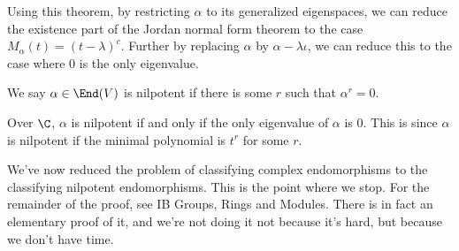 \documentclass[a4paper]{article}
\begin{document}
Using this theorem, by restricting $\alpha$ to its generalized eigenspaces, we can reduce the existence part of the Jordan normal form theorem to the case $M_\alpha(t) = (t - \lambda)^c$. Further by replacing $\alpha$ by $\alpha - \lambda \iota$, we can reduce this to the case where $0$ is the only eigenvalue.

\begin{defi}[Nilpotent]
  We say $\alpha \in \End(V)$ is nilpotent if there is some $r$ such that $\alpha^r = 0$.
\end{defi}
Over $\C$, $\alpha$ is nilpotent if and only if the only eigenvalue of $\alpha$ is $0$. This is since $\alpha$ is nilpotent if the minimal polynomial is $t^r$ for some $r$.

We've now reduced the problem of classifying complex endomorphisms to the classifying nilpotent endomorphisms. This is the point where we stop. For the remainder of the proof, see IB Groups, Rings and Modules. There is in fact an elementary proof of it, and we're not doing it not because it's hard, but because we don't have time.
\end{document}
